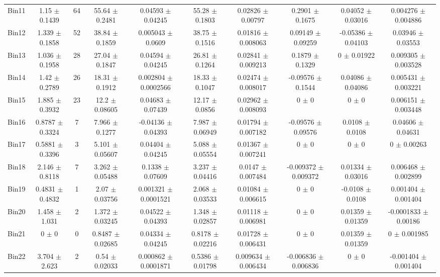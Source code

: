 \begin{tabular}{@{\extracolsep{4pt}}lccccccccc@{}}
     Bin11 & 1.15 $\pm$ 0.1439 & 64 & 55.64 $\pm$ 0.2481 & 0.04593 $\pm$ 0.04245 & 55.28 $\pm$ 0.1803 & 0.02826 $\pm$ 0.00797 & 0.2901 $\pm$ 0.1675 & 0.04052 $\pm$ 0.03016 & 0.004276 $\pm$ 0.004886 \\ 
     Bin12 & 1.339 $\pm$ 0.1858 & 52 & 38.84 $\pm$ 0.1859 & 0.005043 $\pm$ 0.0609 & 38.75 $\pm$ 0.1516 & 0.01816 $\pm$ 0.008063 & 0.09149 $\pm$ 0.09259 & -0.05386 $\pm$ 0.04103 & 0.03946 $\pm$ 0.03553 \\ 
     Bin13 & 1.036 $\pm$ 0.1958 & 28 & 27.04 $\pm$ 0.1847 & 0.04594 $\pm$ 0.04245 & 26.81 $\pm$ 0.1264 & 0.02841 $\pm$ 0.009213 & 0.1879 $\pm$ 0.1329 & 0 $\pm$ 0.01922 & 0.009305 $\pm$ 0.003528 \\ 
     Bin14 & 1.42 $\pm$ 0.2789 & 26 & 18.31 $\pm$ 0.1912 & 0.002804 $\pm$ 0.0002566 & 18.33 $\pm$ 0.1047 & 0.02474 $\pm$ 0.008017 & -0.09576 $\pm$ 0.1544 & 0.04086 $\pm$ 0.04086 & 0.005431 $\pm$ 0.003221 \\ 
     Bin15 & 1.885 $\pm$ 0.3932 & 23 & 12.2 $\pm$ 0.08605 & 0.04683 $\pm$ 0.07439 & 12.17 $\pm$ 0.0856 & 0.02962 $\pm$ 0.008093 & 0 $\pm$ 0 & 0 $\pm$ 0 & 0.006151 $\pm$ 0.003448 \\ 
     Bin16 & 0.8787 $\pm$ 0.3324 & 7 & 7.966 $\pm$ 0.1277 & -0.04136 $\pm$ 0.04393 & 7.987 $\pm$ 0.06949 & 0.01794 $\pm$ 0.007182 & -0.09576 $\pm$ 0.09576 & 0.0108 $\pm$ 0.0108 & 0.04606 $\pm$ 0.04631 \\ 
     Bin17 & 0.5881 $\pm$ 0.3396 & 3 & 5.101 $\pm$ 0.05607 & 0.04404 $\pm$ 0.04245 & 5.088 $\pm$ 0.05554 & 0.01367 $\pm$ 0.007241 & 0 $\pm$ 0 & 0 $\pm$ 0 & 0 $\pm$ 0.00263 \\ 
     Bin18 & 2.146 $\pm$ 0.8118 & 7 & 3.262 $\pm$ 0.05488 & 0.1338 $\pm$ 0.07609 & 3.237 $\pm$ 0.04416 & 0.0147 $\pm$ 0.007484 & -0.009372 $\pm$ 0.009372 & 0.01334 $\pm$ 0.03016 & 0.006468 $\pm$ 0.002899 \\ 
     Bin19 & 0.4831 $\pm$ 0.4832 & 1 & 2.07 $\pm$ 0.03756 & 0.001321 $\pm$ 0.0001521 & 2.068 $\pm$ 0.03533 & 0.01084 $\pm$ 0.006615 & 0 $\pm$ 0 & -0.0108 $\pm$ 0.0108 & 0.001404 $\pm$ 0.001404 \\ 
     Bin20 & 1.458 $\pm$ 1.031 & 2 & 1.372 $\pm$ 0.03245 & 0.04522 $\pm$ 0.04393 & 1.348 $\pm$ 0.02857 & 0.01118 $\pm$ 0.006981 & 0 $\pm$ 0 & 0.01359 $\pm$ 0.01359 & -0.0001833 $\pm$ 0.00186 \\ 
     Bin21 & 0 $\pm$ 0 & 0 & 0.8487 $\pm$ 0.02685 & 0.04334 $\pm$ 0.04245 & 0.8178 $\pm$ 0.02216 & 0.01728 $\pm$ 0.006431 & 0 $\pm$ 0 & 0.01359 $\pm$ 0.01359 & 0 $\pm$ 0.001985 \\ 
     Bin22 & 3.704 $\pm$ 2.623 & 2 & 0.54 $\pm$ 0.02033 & 0.000862 $\pm$ 0.0001871 & 0.5386 $\pm$ 0.01798 & 0.009634 $\pm$ 0.006434 & -0.006836 $\pm$ 0.006836 & 0 $\pm$ 0 & -0.001404 $\pm$ 0.001404 \\ 

\end{tabular}
